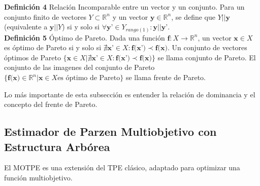 \noindent\textbf{Definición 4} Relación Incomparable entre un vector y un conjunto.  Para un conjunto finito de vectores $Y \subset \mathbb{R}^n$ y un vector $\textbf{y} \in \mathbb{R}^n$, se define que $Y || \textbf{y}$ (equivalente a $\textbf{y}||Y$) si y solo si $\forall \textbf{y'}\in Y_{rango(1)}:\textbf{y}||\textbf{y'}$.\\


\noindent \textbf{Definición 5} Óptimo de Pareto. Dada una función $\textbf{f}: X \rightarrow \mathbb{R}^n$, un vector $\textbf{x}\in X$ es óptimo de Pareto si y solo si $\nexists \textbf{x'}\in X: \textbf{f(x')} \prec \textbf{f(x)} $. Un conjunto de vectores óptimos de Pareto $\{ \textbf{x} \in X | \nexists \textbf{x'}\in X: \textbf{f(x')} \prec \textbf{f(x)} \}$ se llama conjunto de Pareto. El conjunto de las imagenes del conjunto de Pareto $\{ \textbf{f(x)} \in \mathbb{R}^n | \textbf{x}\in X \text{es óptimo de Pareto} \}$ se llama frente de Pareto.






Lo más importante de esta subsección es entender la relación de dominancia y el concepto del frente de Pareto.

\subsection{Estimador de Parzen Multiobjetivo con Estructura Arbórea}

El MOTPE es una extensión del TPE clásico, adaptado para optimizar una función multiobjetivo.

